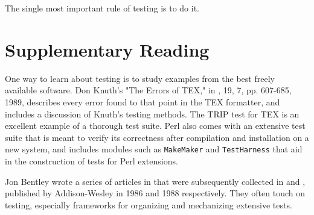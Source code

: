 The single most important rule of testing is to do it.

\section*{Supplementary Reading}

One way to learn about testing is to study examples from the best freely
available software. Don Knuth's "The Errors of TEX," in
, 19, 7, pp. 607-685, 1989,
describes every error found to that point in the TEX formatter, and
includes a discussion of Knuth's testing methods. The TRIP test for TEX is
an excellent example of a thorough test suite. Perl also comes with an
extensive test suite that is meant to verify its correctness after
compilation and installation on a new system, and includes modules such as
\verb'MakeMaker' and \verb'TestHarness' that aid in the construction of
tests for Perl extensions.

Jon Bentley wrote a series of articles in  that were subsequently collected in 
and , published by Addison-Wesley in 1986
and 1988 respectively. They often touch on testing, especially frameworks
for organizing and mechanizing extensive tests.
